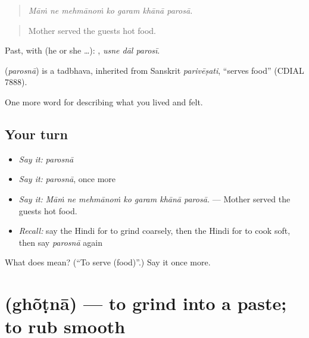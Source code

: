 \begin{quote}
      
\end{quote}

\begin{quote}
\emph{Māṁ ne mehmānoṁ ko garam khānā parosā.}
\end{quote}

\begin{quote}
Mother served the guests hot food.
\end{quote}

Past, with  (he or she …):   , \emph{usne dāl parosī}.

\begin{cousinweb}
\textbf{} (\emph{parosnā}) is a tadbhava, inherited from Sanskrit \emph{parivēṣati}, \textquotedblleft{}serves food\textquotedblright{} (CDIAL 7888).
\end{cousinweb}

\begin{grammarlens}[title={What you've built}]
One more word for describing what you lived and felt.
\end{grammarlens}

\subsection*{Your turn}
\begin{itemize}
\raggedright
  \item \emph{Say it:} \emph{parosnā}
  \item \emph{Say it:} \emph{parosnā}, once more
  \item \emph{Say it:} \emph{Māṁ ne mehmānoṁ ko garam khānā parosā.} — Mother served the guests hot food.
  \item \emph{Recall:} say the Hindi for to grind coarsely, then the Hindi for to cook soft, then say \emph{parosnā} again
\end{itemize}

\begin{tcolorbox}[breakable,colback=teal!4,colframe=teal!35!black,title={Before you move on}]
What does  mean? (\textquotedblleft{}To serve (food)\textquotedblright{}.) Say it once more.
\end{tcolorbox}
\section[\texorpdfstring{\hi{घोंटना} (ghõṭnā)}{घोंटना (ghõṭnā)}]{ (ghõṭnā) — to grind into a paste; to rub smooth}

